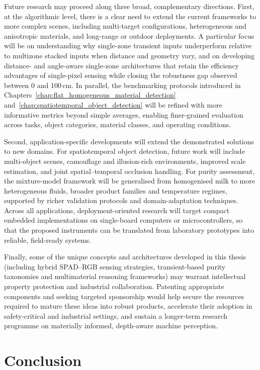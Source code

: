 \documentclass[12pt,a4paper,oneside]{report}
\let\oldsection\section
\renewcommand{\section}{\clearpage\oldsection}
\begin{document}
Future research may proceed along three broad, complementary directions. First, at the algorithmic level, there is a clear need to extend the current frameworks to more complex scenes, including multi-target configurations, heterogeneous and anisotropic materials, and long-range or outdoor deployments. A particular focus will be on understanding why single-zone transient inputs underperform relative to multizone stacked inputs when distance and geometry vary, and on developing distance- and angle-aware single-zone architectures that retain the efficiency advantages of single-pixel sensing while closing the robustness gap observed between 0 and 100\,cm. In parallel, the benchmarking protocols introduced in Chapters~\ref{chap:flat_homogeneous_material_detection} and~\ref{chap:spatiotemporal_object_detection} will be refined with more informative metrics beyond simple averages, enabling finer-grained evaluation across tasks, object categories, material classes, and operating conditions.

Second, application-specific developments will extend the demonstrated solutions to new domains. For spatiotemporal object detection, future work will include multi-object scenes, camouflage and illusion-rich environments, improved scale estimation, and joint spatial--temporal occlusion handling. For purity assessment, the mixture-model framework will be generalised from homogenised milk to more heterogeneous fluids, broader product families and temperature regimes, supported by richer validation protocols and domain-adaptation techniques. Across all applications, deployment-oriented research will target compact embedded implementations on single-board computers or microcontrollers, so that the proposed instruments can be translated from laboratory prototypes into reliable, field-ready systems.

Finally, some of the unique concepts and architectures developed in this thesis (including hybrid SPAD--RGB sensing strategies, transient-based purity taxonomies and multimaterial reasoning frameworks) may warrant intellectual property protection and industrial collaboration. Patenting appropriate components and seeking targeted sponsorship would help secure the resources required to mature these ideas into robust products, accelerate their adoption in safety-critical and industrial settings, and sustain a longer-term research programme on materially informed, depth-aware machine perception.

\section{Conclusion}
\label{sec:conclusion_chapter7}
\end{document}
